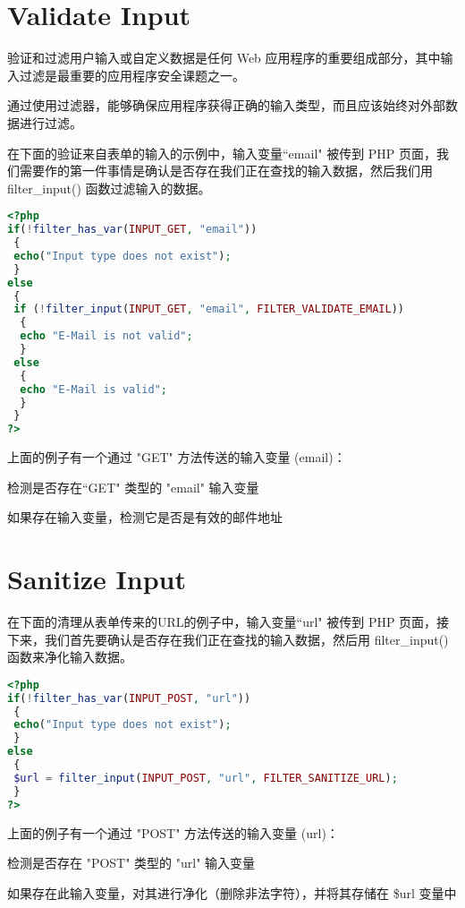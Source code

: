 \section{Validate Input}


验证和过滤用户输入或自定义数据是任何 Web 应用程序的重要组成部分，其中输入过滤是最重要的应用程序安全课题之一。




通过使用过滤器，能够确保应用程序获得正确的输入类型，而且应该始终对外部数据进行过滤。

在下面的验证来自表单的输入的示例中，输入变量``email" 被传到 PHP 页面，我们需要作的第一件事情是确认是否存在我们正在查找的输入数据，然后我们用 filter\_input() 函数过滤输入的数据。


\begin{lstlisting}[language=PHP]
<?php
if(!filter_has_var(INPUT_GET, "email"))
 {
 echo("Input type does not exist");
 }
else
 {
 if (!filter_input(INPUT_GET, "email", FILTER_VALIDATE_EMAIL))
  {
  echo "E-Mail is not valid";
  }
 else
  {
  echo "E-Mail is valid";
  }
 }
?>
\end{lstlisting}

上面的例子有一个通过 "GET" 方法传送的输入变量 (email)：

\begin{compactenum}
\item 检测是否存在``GET" 类型的 "email" 输入变量
\item 如果存在输入变量，检测它是否是有效的邮件地址
\end{compactenum}


\section{Sanitize Input}


在下面的清理从表单传来的URL的例子中，输入变量``url" 被传到 PHP 页面，接下来，我们首先要确认是否存在我们正在查找的输入数据，然后用 filter\_input() 函数来净化输入数据。

\begin{lstlisting}[language=PHP]
<?php
if(!filter_has_var(INPUT_POST, "url"))
 {
 echo("Input type does not exist");
 }
else
 {
 $url = filter_input(INPUT_POST, "url", FILTER_SANITIZE_URL);
 }
?>
\end{lstlisting}


上面的例子有一个通过 "POST" 方法传送的输入变量 (url)：

\begin{compactenum}
\item 检测是否存在 "POST" 类型的 "url" 输入变量
\item 如果存在此输入变量，对其进行净化（删除非法字符），并将其存储在 \$url 变量中
\end{compactenum}

